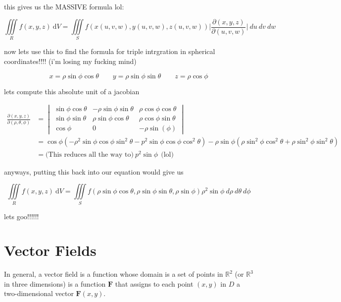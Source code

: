 \documentclass{article}
\begin{document}
this gives us the MASSIVE formula lol:

$$\iiint\limits_{R} f(x,y,z) \ \mathrm{d}V = \iiint\limits_{S} f(x(u,v,w), y(u,v,w), z(u,v,w)) \bigg\rvert \frac{\partial(x,y,z)}{\partial(u,v,w)} \bigg\rvert \ du \ dv \ dw$$

now lets use this to find the formula for triple intrgration in spherical coordinates!!!! (i'm losing my fucking mind) 

$$x =  \rho \sin{\phi} \cos{\theta} \qquad y = \rho \sin{\phi} \sin{\theta} \qquad z = \rho \cos{\phi}$$

lets compute this absolute unit of a jacobian 

\begin{align*}
    \frac{\partial(x,y,z)}{\partial(\rho,\theta,\phi)} &= \begin{vmatrix}
    \sin{\phi}\cos{\theta}  & -\rho\sin{\phi}\sin{\theta}  & \rho \cos{\phi} \cos{\theta} \\[6pt]
    \sin{\phi}\sin{\theta}   & \rho \sin{\phi} \cos{\theta} & \rho \cos{\phi}\sin{\theta}  \\[6pt]
    \cos{\phi}  & 0 & - \rho \sin(\phi)    
    \end{vmatrix} \\ 
    & = \cos{\phi} (-\rho^2\sin{\phi}\cos{\phi}\sin^2{\theta} - p^2\sin{\phi}\cos{\phi}\cos^2{\theta}) - \rho\sin{\phi} (\rho \sin^2{\phi}\cos^2{\theta + \rho \sin^2{\phi} \sin^2{\theta}}) \\ 
    & = \text{(This reduces all the way to)}  \ p^2\sin{\phi}  \ \ \text{(lol)} 
\end{align*}

anyways, putting this back into our equation would give us

$$\iiint\limits_{R}f(x,y,z) \ \mathrm{d}V = \iiint\limits_{S} f(\rho\sin{\phi}\cos{\theta}, \rho\sin{\phi}\sin{\theta}, \rho\sin{\phi}) \rho^2 \sin{\phi} \ d\rho \ d\theta \ d\phi$$

lets goo!!!!!!



\newpage
\section{Vector Fields}

\begin{center}
    In general, a vector field is a function whose domain is a set of points in $\mathbb{R}^2$ (or $\mathbb{R}^3$ in three dimensions) is a function $\mathbf{F}$ that assigns to each point $(x,y)$ in $D$ a two-dimensional vector $\mathbf{F}(x,y)$. 
\end{center}
\end{document}
